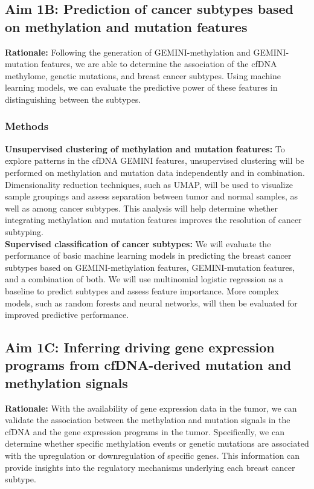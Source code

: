 \documentclass[11pt]{article}
\begin{document}

\subsection*{Aim 1B: Prediction of cancer subtypes based on methylation and mutation features}
\textbf{Rationale:}
Following the generation of GEMINI-methylation and GEMINI-mutation features,
we are able to determine the association of the cfDNA methylome, genetic mutations,
and breast cancer subtypes. Using machine learning models, we can evaluate the 
predictive power of these features in distinguishing between the subtypes.
\subsubsection*{Methods}
\textbf{Unsupervised clustering of methylation and mutation features:}
To explore patterns in the cfDNA GEMINI features, unsupervised clustering will be performed on methylation and mutation data independently and in combination. Dimensionality reduction techniques, such as UMAP, will be used to visualize sample groupings and assess separation between tumor and normal samples, as well as among cancer subtypes. This analysis will help determine whether integrating methylation and mutation features improves the resolution of cancer subtyping.
\medskip \\
\textbf{Supervised classification of cancer subtypes:}
We will evaluate the performance of basic machine learning models in predicting the 
breast cancer subtypes based on GEMINI-methylation features, GEMINI-mutation features, and a combination of both. 
We will use multinomial logistic regression as a baseline to predict subtypes and assess feature importance. More complex models, such as random forests and neural networks, will then be evaluated for improved predictive performance.
\subsection*{Aim 1C: Inferring driving gene expression programs from cfDNA-derived mutation and methylation signals}
\textbf{Rationale:}
With the availability of gene expression data in the tumor, we can validate the association between the methylation and mutation signals in the cfDNA and the gene expression programs in the tumor. Specifically, we can determine whether specific methylation events or genetic mutations are associated with the upregulation or downregulation of specific genes. This information can provide insights into the regulatory mechanisms underlying each breast cancer subtype.
\end{document}
